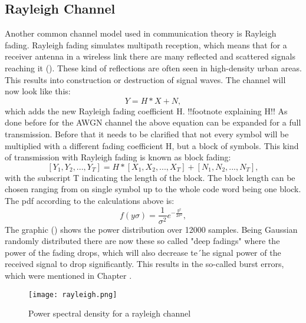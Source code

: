 \subsection{Rayleigh Channel}
\label{rayleigh}
Another common channel model used in communication theory is Rayleigh fading. Rayleigh fading simulates multipath reception, which means that for a receiver antenna in a wireless link there are many reflected and scattered signals reaching it (). These kind of reflections are often seen in high-density urban areas. This results into construction or destruction of signal waves. The channel will now look like this:
\begin{equation}
\label{eq:rayleigh1}
Y = H * X + N,  
\end{equation}
which adds the new Rayleigh fading coefficient H. !!footnote explaining H!!
\newline
As done before for the \gls{AWGN} channel the above equation can be expanded for a full transmission. Before that it needs to be clarified that not every symbol will be multiplied with a different fading coefficient H, but a block of symbols. This kind of transmission with Rayleigh fading is known as block fading:
\begin{equation}
\label{eq:rayleigh2}
[Y_1,Y_2,...,Y_T] = H * [X_1,X_2,...,X_T] + [N_1,N_2,...,N_T],  
\end{equation}
with the subscript T indicating the length of the block. The block length can be chosen ranging from on single symbol up to the whole code word being one block. 
The pdf according to the calculations above is:
\begin{equation}
\label{eq:raypdf}
f(y\sigma) = \frac{1}{\sigma^2}e^{-\frac{y^2}{2\sigma^2}},
\end{equation}
\newline
The graphic () shows the power distribution over 12000 samples. Being Gaussian randomly distributed there are now these so called "deep fadings" where the power of the fading drops, which will also decrease te´he signal power of the received signal to drop significantly. This results in the so-called burst errors, which were mentioned in Chapter .


\begin{figure}[!htb]
	\centering
	\texttt{[image: rayleigh.png]}
	\caption{Power spectral density for a rayleigh channel}
	\label{fig:rayleigh}
\end{figure}